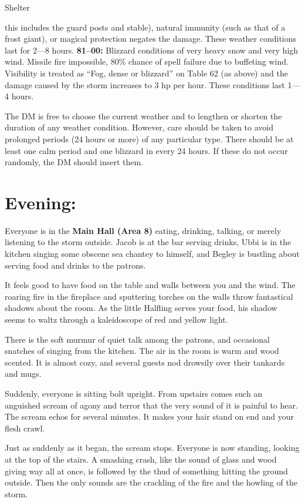 \documentclass[a5paper,11pt,twoside]{book}
\newcommand{\MapText}[1]{
	{\color{DarkCyan} \textbf{#1}}
}
\newcommand{\QuoteText}[1]{
	{\color{Black!80} {\fontspec{Gotham-Book}\small#1}}
}
\begin{document}
Shelter {this includes the guard posts and stable), natural immunity (such as that of a frost giant), or magical protection negates the damage.
These weather conditions last for 2—8 hours.
\vspace{0.5em}
\hline
\textbf{\large81--00:} \quad Blizzard conditions of very heavy snow and very high wind.
Missile fire impossible, 80\% chance of spell failure due to buffeting wind.
Visibility is treated as “Fog, dense or blizzard” on Table 62 (as above) and the damage caused by the storm increases to 3 hp per hour.
These conditions last 1—4 hours.
\vspace{0.5em}
\hline

The DM is free to choose the current weather and to lengthen or shorten the duration of any weather condition.
However, care should be taken to avoid prolonged periods (24 hours or more) of any particular type.
There should be at least one calm period and one blizzard in every 24 hours.
If these do not occur randomly, the DM should insert them.
\pagebreak

\section*{Evening: } Everyone is in the \MapText{Main Hall (Area 8)} eating, drinking, talking, or merely listening to the storm outside.
Jacob is at the bar serving drinks, Ubbi is in the kitchen singing some obscene sea chantey to himself, and Begley is bustling about serving food and drinks to the patrons.

\QuoteText{
It feels good to have food on the table and walls between you and the wind.
The roaring fire in the fireplace and sputtering torches on the walls throw fantastical shadows about the room.
As the little Halfling serves your food, his shadow seems to waltz through a kaleidoscope of red and yellow light.}

\QuoteText{There is the soft murmur of quiet talk among the patrons, and occasional snatches of singing from the kitchen.
The air in the room is warm and wood scented.
It is almost cozy, and several guests nod drowsily over their tankards and mugs.}

\QuoteText{Suddenly, everyone is sitting bolt upright.
From upstairs comes such an anguished scream of agony and terror that the very sound of it is painful to hear.
The scream echos for several minutes.
It makes your hair stand on end and your flesh crawl.}

\QuoteText{Just as suddenly as it began, the scream stops.
Everyone is now standing, looking at the top of the stairs.
A smashing crash, like the sound of glass and wood giving way all at once, is followed by the thud of something hitting the ground outside.
Then the only sounds are the crackling of the fire and the howling of the storm.}

}
\end{document}
